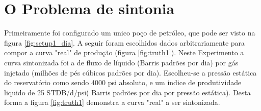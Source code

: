 \section{O Problema de sintonia}
Primeiramente foi configurado um unico poço de petróleo, que pode ser visto na figura \ref{fig:setup1_dia}. A seguir foram escolhidos dados arbitrariamente para compor a curva "real" de produção (figura \ref{fig:truth1}).
Neste Experimento a curva sintonizada foi a de fluxo de líquido (Barris padrões por dia) por gás injetado (milhões de pés cúbicos padrões por dia). Escolheu-se a pressão estática do reservatório como sendo 4000 psi absoluto, e um indice de produtividade liquido de 25 STDB/d/psi( Barris padrões por dia por pressão estática). Desta forma a figura \ref{fig:truth1} demonstra a curva "real" a ser sintonizada.



